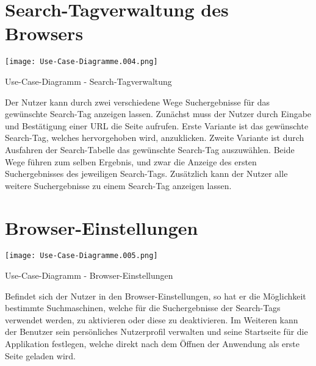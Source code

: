 \section{Search-Tagverwaltung des Browsers}

\texttt{[image: Use-Case-Diagramme.004.png]}
	\caption{Use-Case-Diagramm - Search-Tagverwaltung}
	\label{fig:Rankingablauf}

Der Nutzer kann durch zwei verschiedene Wege Suchergebnisse für das gewünschte Search-Tag anzeigen lassen. Zunächst muss der Nutzer durch Eingabe und Bestätigung einer URL die Seite aufrufen. Erste Variante ist das gewünschte Search-Tag, welches hervorgehoben wird, anzuklicken. Zweite Variante ist durch Ausfahren der Search-Tabelle das gewünschte Search-Tag auszuwählen. Beide Wege führen zum selben Ergebnis, und zwar die Anzeige des ersten Suchergebnisses des jeweiligen Search-Tags. Zusätzlich kann der Nutzer alle weitere Suchergebnisse zu einem Search-Tag anzeigen lassen.

\section{Browser-Einstellungen}

\texttt{[image: Use-Case-Diagramme.005.png]}
	\caption{Use-Case-Diagramm - Browser-Einstellungen}
	\label{fig:Rankingablauf}

Befindet sich der Nutzer in den Browser-Einstellungen, so hat er die Möglichkeit bestimmte Suchmaschinen, welche für die Suchergebnisse der Search-Tags verwendet werden, zu aktivieren oder diese zu deaktivieren. Im Weiteren kann der Benutzer sein persönliches Nutzerprofil verwalten und seine Startseite für die Applikation festlegen, welche direkt nach dem Öffnen der Anwendung als erste Seite geladen wird.
